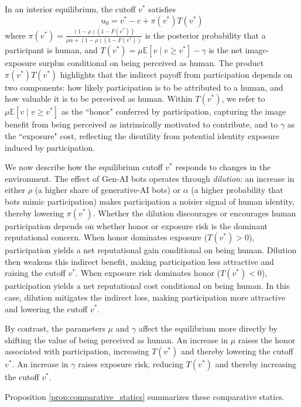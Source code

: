 \documentclass[12pt,notitlepage]{article}
\theoremstyle{plain}
\theoremstyle{plain}
\theoremstyle{definition}
\theoremstyle{definition}
\theoremstyle{assumption}
\theoremstyle{plain}
\theoremstyle{plain}
\theoremstyle{plain}
\theoremstyle{plain}
\theoremstyle{definition}%
\theoremstyle{plain}
\theoremstyle{plain}
\theoremstyle{plain}
\theoremstyle{plain}
\begin{document}
In an interior equilibrium, the cutoff $v^*$ satisfies
\[
u_0=v^*-c+\pi(v^*)T(v^*)
\]
where
$\pi(v^*) = \frac{(1-\rho)(1-F(v^*))}{\rho \alpha + (1-\rho)(1-F(v^*))}$ is the posterior probability that a participant is human, and $T(v^*)=\mu \mathbb{E}[v\mid v\geq v^*] - \gamma$ is the net image-exposure surplus conditional on being perceived as human. The product $\pi(v^*)T(v^*)$ highlights that the indirect payoff from participation depends on two components: how likely participation is to be attributed to a human, and how valuable it is to be perceived as human. Within $T(v^*)$, we refer to $\mu \mathbb{E}[v\mid v\geq v^*]$ as the ``honor"  conferred by participation, capturing the image benefit from being perceived as intrinsically motivated to contribute, and to $\gamma$ as the ``exposure" cost, reflecting the disutility from potential identity exposure induced by participation.

We now describe how the equilibrium cutoff $v^*$ responds to changes in the environment. The effect of Gen-AI bots operates through \textit{dilution}: an increase in either $\rho$ (a higher share of generative-AI bots) or $\alpha$ (a higher probability that bots mimic participation) makes participation a noisier signal of human identity, thereby lowering $\pi(v^*)$. Whether the dilution discourages or encourages human participation depends on whether honor or exposure risk is the dominant reputational concern. When honor dominates exposure ($T(v^*)>0$), participation yields a net reputational gain conditional on being human. Dilution then weakens this indirect benefit, making participation less attractive and raising the cutoff $v^*$. When exposure risk dominates honor ($T(v^*)<0$), participation yields a net reputational cost conditional on being human. In this case, dilution mitigates the indirect loss, making participation more attractive and lowering the cutoff $v^*$.

By contrast, the parameters $\mu$ and $\gamma$ affect the equilibrium more directly by shifting the value of being perceived as human. An increase in $\mu$ raises the honor associated with participation, increasing $T(v^*)$ and thereby lowering the cutoff $v^*$. An increase in $\gamma$ raises exposure risk, reducing $T(v^*)$ and thereby increasing the cutoff $v^*$.

Proposition \ref{prop:comparative_statics} summarizes these comparative statics.
\end{document}
